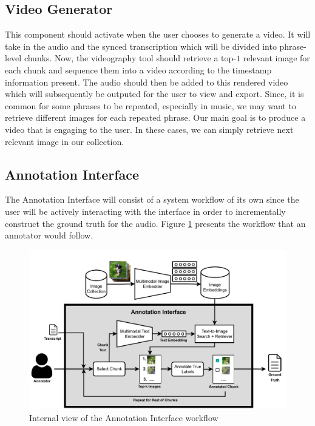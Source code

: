 \documentclass{l4proj}
\begin{document}
\subsection{Video Generator}
This component should activate when the user chooses to generate a video. It will take in the audio and the synced transcription which will be divided into phrase-level chunks. Now, the videography tool should retrieve a top-$1$ relevant image for each chunk and sequence them into a video according to the timestamp information present. The audio should then be added to this rendered video which will subsequently be outputed for the user to view and export. Since, it is common for some phrases to be repeated, especially in music, we may want to retrieve different images for each repeated phrase. Our main goal is to produce a video that is engaging to the user. In these cases, we can simply retrieve next relevant image in our collection.

\subsection{Annotation Interface}
The Annotation Interface will consist of a system workflow of its own since the user will be actively interacting with the interface in order to incrementally construct the ground truth for the audio. Figure \ref{fig:annotation_interface} presents the workflow that an annotator would follow.

\begin{figure}[h]
    \centering
    \includegraphics[width=1\textwidth]{annotation_interface.pdf}
    \caption{Internal view of the Annotation Interface workflow}
    \label{fig:annotation_interface}
\end{figure}
\end{document}
